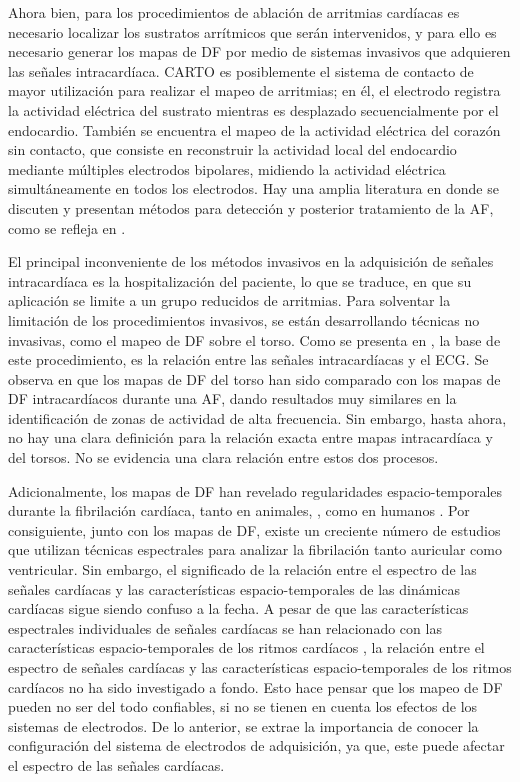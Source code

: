 Ahora bien, para los procedimientos de ablación de arritmias cardíacas es
necesario localizar los sustratos arrítmicos que serán intervenidos, y para ello
es necesario generar los mapas de \ac{DF} por medio de sistemas invasivos que
adquieren las señales intracardíaca. CARTO \cite{gepstein1997} es posiblemente
el sistema de contacto de mayor utilización para realizar el mapeo de arritmias;
en él, el electrodo registra la actividad eléctrica del sustrato mientras es
desplazado secuencialmente por el endocardio.
También se encuentra el mapeo de la actividad eléctrica del corazón sin
contacto, que consiste en reconstruir la actividad local del endocardio mediante
múltiples electrodos bipolares, midiendo la actividad eléctrica simultáneamente
en todos los electrodos. Hay una amplia literatura en donde se discuten y
presentan métodos para detección y posterior tratamiento de la \ac{AF}, como se
refleja en \cite{richter2011novel, kogawa2015effect}.


El principal inconveniente de los métodos invasivos en la adquisición de señales
intracardíaca es la hospitalización del paciente, lo que se traduce, en que su
aplicación se limite a un grupo reducidos de arritmias. Para solventar la
limitación de los procedimientos invasivos, se están desarrollando técnicas no
invasivas, como el mapeo de \ac{DF} sobre el torso.  Como se presenta en
\cite{Richter08, Hsu08,Dibs08}, la base de este procedimiento, es la relación
entre las señales intracardíacas y el \ac{ECG}.
Se observa en \cite{Guillem13, Guillem09} que los mapas de \ac{DF} del torso han
sido comparado con los mapas de \ac{DF} intracardíacos durante una \ac{AF},
dando resultados muy similares en la identificación de zonas de actividad de
alta frecuencia. Sin embargo, hasta ahora, no hay una clara definición para la
relación exacta entre mapas intracardíaca y del torsos.  No se evidencia una
clara relación entre estos dos procesos.


Adicionalmente, los mapas de \ac{DF} han revelado regularidades
espacio-temporales durante la fibrilación cardíaca, tanto en animales,
\cite{Skanes98, Mandapati00, Mansour01}, como en humanos \cite{Sanders05,
Atienza06, atienza2009, Berenfeld11}. Por consiguiente, junto con los mapas de
\ac{DF}, existe un creciente número de estudios que utilizan técnicas
espectrales para analizar la fibrilación tanto auricular como ventricular. Sin
embargo, el significado de la relación entre el espectro de las señales
cardíacas  y las características espacio-temporales de las dinámicas cardíacas
sigue siendo confuso a la fecha. A pesar de que las características espectrales
individuales de señales cardíacas se han relacionado con las características
espacio-temporales de los ritmos cardíacos \cite{Fischer07, Ng07a, Zlochiver08},
la relación entre el espectro de señales cardíacas y las características
espacio-temporales de los ritmos cardíacos no ha sido investigado a fondo. Esto
hace pensar que los mapeo de \ac{DF} pueden no ser del todo confiables, si no se
tienen en cuenta los efectos de los sistemas de electrodos.
De lo anterior, se extrae la importancia de conocer la configuración del sistema
de electrodos de adquisición, ya que, este puede afectar el espectro de las
señales cardíacas.

